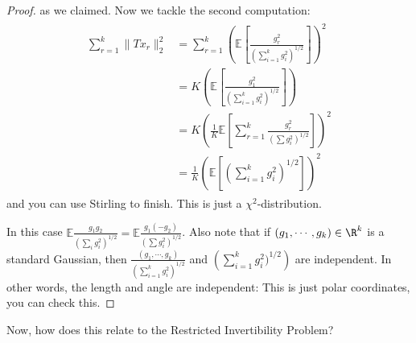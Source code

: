 \begin{proof}
as we claimed. Now we tackle the second computation: 
\begin{align}
\begin{split}
\sum_{r = 1}^k \|Tx_r\|_2^2 &= \sum_{r = 1}^k \left(\mathbb{E} \left[\frac{g_r^2}{\left(\sum_{i = 1}^k g_i^2\right)^{1/2}}\right]\right)^2
\\
&= K \left(\mathbb{E}\left[\frac{g_1^2}{\left(\sum_{i = 1}^k g_i^2\right)^{1/2}}\right]\right)
\\
&= K\left(\frac{1}{K}\mathbb{E}\left[\sum_{r = 1}^k \frac{g_r^2}{\left(\sum g_i^2\right)^{1/2}}\right]\right)^2
\\
&= \frac{1}{K} \left(\mathbb{E}\left[\left(\sum_{i = 1}^k g_i^2\right)^{1/2}\right]\right)^2
\end{split}
\end{align}
and you can use Stirling to finish. This is just a $\chi^2$-distribution. 

In this case $\mathbb{E} \frac{g_1g_2}{\left(\sum_i g_i^2\right)^{1/2}} = \mathbb{E} \frac{g_1 (-g_2)}{\left(\sum g_i^2\right)^{1/2}}$. 
Also note that if $(g_1, \cdots, g_k) \in \R^k$ is a standard Gaussian, then $\frac{(g_1, \cdots, g_k)}{\left(\sum_{i = 1}^k g_i^2\right)^{1/2}}$ and $\left(\sum_{i = 1}^k g_i^2)^{1/2}\right)$ are independent. In other words, the length and angle are independent: This is just polar coordinates, you can check this. 
\end{proof}

Now, how does this relate to the Restricted Invertibility Problem? 

